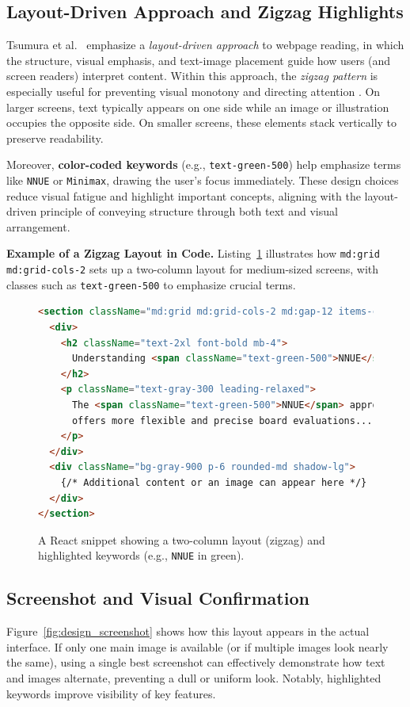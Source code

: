 \documentclass[12pt,a4paper]{article}
\begin{document}
\subsection{Layout-Driven Approach and Zigzag Highlights}
Tsumura et al.~\cite{tsumura2022layout} emphasize a \emph{layout-driven approach} 
to webpage reading, in which the structure, visual emphasis, and text-image 
placement guide how users (and screen readers) interpret content. 
Within this approach, the \emph{zigzag pattern} is especially useful 
for preventing visual monotony and directing attention . 
On larger screens, text typically appears on one side while an image 
or illustration occupies the opposite side. On smaller screens, 
these elements stack vertically to preserve readability.

Moreover, \textbf{color-coded keywords} (e.g., \texttt{text-green-500}) 
help emphasize terms like \texttt{NNUE} or \texttt{Minimax}, 
drawing the user’s focus immediately. These design choices reduce 
visual fatigue and highlight important concepts, aligning with the 
layout-driven principle of conveying structure through both text 
and visual arrangement.

\vspace{1em}
\noindent
\textbf{Example of a Zigzag Layout in Code.}  
Listing~\ref{lst:design_snippet} illustrates how 
\texttt{md:grid md:grid-cols-2} sets up a two-column 
layout for medium-sized screens, with classes such 
as \texttt{text-green-500} to emphasize crucial terms.

\begin{figure}[htb]
\centering
\begin{lstlisting}[language=HTML, breaklines=true, basicstyle=\small\ttfamily]
<section className="md:grid md:grid-cols-2 md:gap-12 items-center">
  <div>
    <h2 className="text-2xl font-bold mb-4">
      Understanding <span className="text-green-500">NNUE</span>
    </h2>
    <p className="text-gray-300 leading-relaxed">
      The <span className="text-green-500">NNUE</span> approach 
      offers more flexible and precise board evaluations...
    </p>
  </div>
  <div className="bg-gray-900 p-6 rounded-md shadow-lg">
    {/* Additional content or an image can appear here */}
  </div>
</section>
\end{lstlisting}
\caption{A React snippet showing a two-column layout (zigzag) and 
highlighted keywords (e.g., \texttt{NNUE} in green).}
\label{lst:design_snippet}
\end{figure}

\subsection{Screenshot and Visual Confirmation}
Figure~\ref{fig:design_screenshot} shows how this layout appears 
in the actual interface. If only one main image is available (or 
if multiple images look nearly the same), using a single best 
screenshot can effectively demonstrate how text and images 
alternate, preventing a dull or uniform look. Notably, highlighted 
keywords improve visibility of key features.
\end{document}
